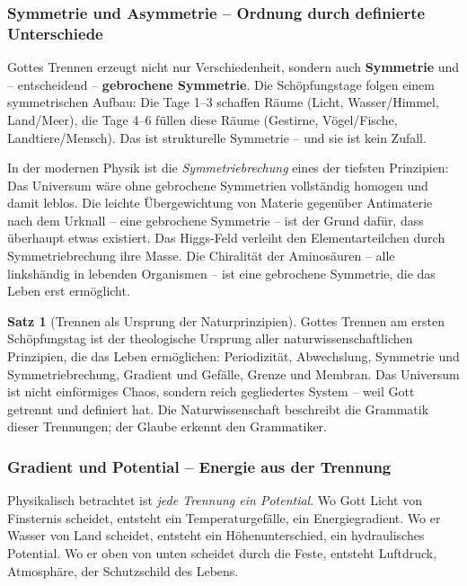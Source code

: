 ﻿\documentclass[a4paper,12pt]{article}
\theoremstyle{definition}
\newtheorem{theorem}{Satz}[section]
\begin{document}
\subsubsection{Symmetrie und Asymmetrie -- Ordnung durch definierte Unterschiede}

Gottes Trennen erzeugt nicht nur Verschiedenheit, sondern auch \textbf{Symmetrie}
und -- entscheidend -- \textbf{gebrochene Symmetrie}. Die Schöpfungstage folgen
einem symmetrischen Aufbau: Die Tage 1--3 schaffen Räume (Licht, Wasser/Himmel,
Land/Meer), die Tage 4--6 füllen diese Räume (Gestirne, Vögel/Fische,
Landtiere/Mensch). Das ist strukturelle Symmetrie -- und sie ist kein Zufall.

In der modernen Physik ist die \textit{Symmetriebrechung} eines der tiefsten
Prinzipien: Das Universum wäre ohne gebrochene Symmetrien vollständig homogen
und damit leblos. Die leichte Übergewichtung von Materie gegenüber Antimaterie
nach dem Urknall -- eine gebrochene Symmetrie -- ist der Grund dafür, dass
überhaupt etwas existiert. Das Higgs-Feld verleiht den Elementarteilchen durch
Symmetriebrechung ihre Masse. Die Chiralität der Aminosäuren -- alle linkshändig
in lebenden Organismen -- ist eine gebrochene Symmetrie, die das Leben erst
ermöglicht.

\begin{theorem}[Trennen als Ursprung der Naturprinzipien]
	Gottes Trennen am ersten Schöpfungstag ist der theologische Ursprung aller
	naturwissenschaftlichen Prinzipien, die das Leben ermöglichen: Periodizität,
	Abwechslung, Symmetrie und Symmetriebrechung, Gradient und Gefälle, Grenze
	und Membran. Das Universum ist nicht einförmiges Chaos, sondern reich gegliedertes
	System -- weil Gott getrennt und definiert hat. Die Naturwissenschaft beschreibt
	die Grammatik dieser Trennungen; der Glaube erkennt den Grammatiker.
\end{theorem}

\subsubsection{Gradient und Potential -- Energie aus der Trennung}

Physikalisch betrachtet ist \textit{jede Trennung ein Potential}. Wo Gott Licht
von Finsternis scheidet, entsteht ein Temperaturgefälle, ein Energiegradient.
Wo er Wasser von Land scheidet, entsteht ein Höhenunterschied, ein hydraulisches
Potential. Wo er oben von unten scheidet durch die Feste, entsteht Luftdruck,
Atmosphäre, der Schutzschild des Lebens.
\end{document}
